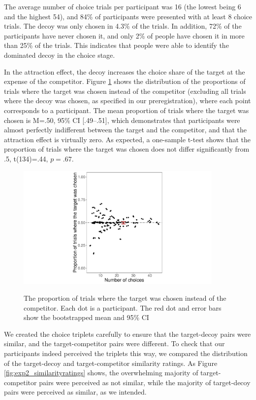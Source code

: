 \documentclass[12pt, a4paper]{article}
\begin{document}
The average number of choice trials per participant was 16 (the lowest being 6 and the highest 54), and 84\% of participants were presented with at least 8 choice trials. The decoy was only chosen in 4.3\% of the trials. In addition, 72\% of the participants have never chosen it, and only 2\% of people have chosen it in more than 25\% of the trials. This indicates that people were able to identify the dominated decoy in the choice stage.

In the attraction effect, the decoy increases the choice share of the target at the expense of the competitor. Figure \ref{fig:exp2_res} shows the distribution of the proportions of trials where the target was chosen instead of the competitor (excluding all trials where the decoy was chosen, as specified in our preregistration), where each point corresponds to a participant. The mean proportion of trials where the target was chosen is M=.50, 95\% CI [.49--.51], which demonstrates that participants were almost perfectly indifferent between the target and the competitor, and that the attraction effect is virtually zero. As expected, a one-sample t-test shows that the proportion of trials where the target was chosen does not differ significantly from .5, t(134)=.44, $p=.67$.  

\begin{figure}[htb!]
\centering
\captionsetup{justification=centering}
\caption{The proportion of trials where the target was chosen instead of the competitor. Each dot is a participant. The red dot and error bars show the bootstrapped mean and 95\% CI}
\includegraphics[width=0.9\textwidth]{figure4.pdf}
\label{fig:exp2_res}
\end{figure}

We created the choice triplets carefully to ensure that the target-decoy pairs were similar, and the target-competitor pairs were different. To check that our participants indeed perceived the triplets this way, we compared the distribution of the target-decoy and target-competitor similarity ratings. As Figure \ref{fig:exp2_similarityratings} shows, the overwhelming majority of target-competitor pairs were perceived as not similar, while the majority of target-decoy pairs were perceived as similar, as we intended.
\end{document}
